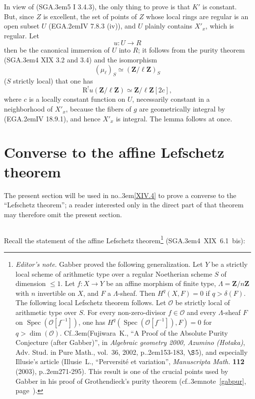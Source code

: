 \documentclass[11pt,a4paper,oneside]{book}
\providecommand{\pageoriginale}{%
  \refstepcounter{pageoriginal}%
  \marginpar{\raggedright\footnotesize\bfseries\thepageoriginal}%
  \xspace}
\providecommand{\nde}[1]{\footnote{\textit{Editor's note.} #1}}
\providecommand{\og}{``}
\providecommand{\fg}{''\xspace}
\providecommand{\cf}{cf.\kern.3em}
\providecommand{\Cf}{Cf.\kern.3em}
\providecommand{\EGA}{\textup{EGA}\kern.2em}
\providecommand{\SGA}{\textup{SGA}\kern.3em}
\providecommand{\ptbl}{.\kern.2em}
\providecommand{\numero}{no.\kern.3em}
\providecommand{\Oo}{\mathcal O}
\providecommand{\ZZ}{\mathbf Z}
\providecommand{\Spec}{\operatorname{Spec}}
\providecommand{\R}{\mathrm R}
\theoremstyle{plain}
\theoremstyle{definition}
\theoremstyle{remark}
\renewcommand{\Ref}[1]{\textup{\ref{#1}}}
\begin{document}
\enlargethispage{\baselineskip}%
In view of (\SGA 5 I 3.4.3), the only thing to prove is that $K'$ is constant. But, since $Z$ is excellent, the set of points of $Z$ whose\pageoriginale local rings are regular is an open subset $U$ (\EGA IV 7.8.3 \textup{(iv)}), and $U$ plainly contains $X'_x$, which is regular. Let
$$u:U\to R$$
then be the canonical immersion of $U$ into $R$; it follows from the purity theorem (\SGA 4 XIX 3.2 and 3.4) and the isomorphism
$$(\mu_\ell)_S\simeq(\ZZ/\ell\ZZ)_S$$
($S$ strictly local) that one has
$$
\R^!u(\ZZ/\ell\ZZ)\simeq\ZZ/\ell\ZZ[2c],
$$
where $c$ is a locally constant function on $U$, necessarily constant in a neighborhood of $X'_x$, because the fibers of $g$ are geometrically integral by (\EGA IV 18.9.1), and hence $X'_x$ is integral. The lemma follows at once.

\section{Converse to the affine Lefschetz theorem} \label{XIV.3}

The present section will be used in \numero \Ref{XIV.4} to prove a converse to the \og Lefschetz theorem\fg; a reader interested only in the direct part of that theorem may therefore omit the present section.

\subsection{\texorpdfstring{}{XIV.3.1}} \label{XIV.3.1}

Recall the statement of the affine Lefschetz theorem\nde{\label{gabaf}Gabber proved the following generalization. Let $Y$ be a strictly local scheme of arithmetic type over a regular Noetherian scheme $S$ of dimension $\leq 1$. Let $f:X\to Y$ be an affine morphism of finite type, $\Lambda=\ZZ/n\ZZ$ with $n$ invertible on $X$, and $F$ a $\Lambda$-sheaf. Then $H^q(X,F)=0$ if $q>\delta(F)$. The following local Lefschetz theorem follows. Let $\Oo$ be strictly local of arithmetic type over $S$. For every non-zero-divisor $f\in \Oo$ and every $\Lambda$-sheaf $F$ on $\Spec(\Oo[f^{-1}])$, one has $H^q(\Spec(\Oo[f^{-1}]),F)=0$ for $q>\dim(\Oo)$. \Cf (Fujiwara~K., {\og A Proof of the Absolute Purity Conjecture (after Gabber)\fg}, in \emph{Algebraic geometry 2000, Azumino (Hotaka)}, Adv. Stud. in Pure Math., vol.~36, 2002, p\ptbl 153-183, $\S$5), and especially Illusie's article (Illusie~L., {\og Perversité et variation\fg}, \emph{Manuscripta Math.} \textbf{112} (2003), p\ptbl 271-295). This result is one of the crucial points used by Gabber in his proof of Grothendieck's purity theorem (\cf note~\eqref{gabpur}, page~\pageref{gabpur}).} (\SGA 4~XIX~6.1~bis):
\end{document}
